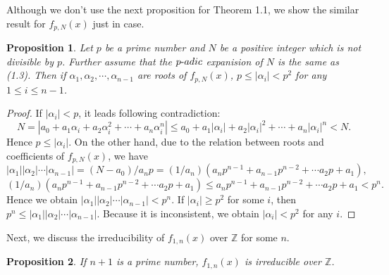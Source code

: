 \documentclass{article}
\newtheorem{prop}{Proposition}[section]
\begin{document}
Although we don't use the next proposition for Theorem 1.1, we show the similar result for $f_{p,N}(x)$ just in case.
\begin{prop}
\upshape
Let $p$ be a prime number and $N$ be a positive integer which is not divisible by $p$. Further assume that the $p\mathchar`-adic$ expanision of $N$ is the same as (1.3). Then if $\alpha_{1}, \alpha_{2}, \cdots, \alpha_{n-1}$ are roots of $f_{p,N}(x)$, $p\leq |\alpha_{i}|< p^{2}$ for any $1\leq i\leq n-1$.
\end{prop}

\begin{proof}
If $|\alpha_{i}|<p$, it leads following contradiction:
\begin{equation}
N=|a_{0}+a_{1}\alpha_{i}+a_{2}\alpha_{i}^{2}+\cdots+a_{n}\alpha_{i}^{n}|\leq a_{0}+a_{1}|\alpha_{i}|+a_{2}|\alpha_{i}|^{2}+\cdots+a_{n}|\alpha_{i}|^{n}<N \nonumber.
\end{equation}
Hence $p\leq |\alpha_{i}|$. On the other hand, due to the relation between roots and coefficients of $f_{p,N}(x)$, we have
\begin{equation}
|\alpha_{1}||\alpha_{2}|\cdots|\alpha_{n-1}|=(N-a_{0})/a_{n}p= (1/a_{n})(a_{n}p^{n-1}+a_{n-1}p^{n-2}+\cdots a_{2}p+a_{1}),
\end{equation}
\begin{equation}
(1/a_{n})(a_{n}p^{n-1}+a_{n-1}p^{n-2}+\cdots a_{2}p+a_{1})\leq a_{n}p^{n-1}+a_{n-1}p^{n-2}+\cdots a_{2}p+a_{1}<p^{n}.
\end{equation}
Hence we obtain $|\alpha_{1}||\alpha_{2}|\cdots|\alpha_{n-1}|<p^{n}$. If $|\alpha_{i}|\geq p^{2}$ for some $i$, then $p^{n}\leq |\alpha_{1}||\alpha_{2}|\cdots|\alpha_{n-1}|$. Because it is inconsistent, we obtain $|\alpha_{i}|<p^{2}$ for any ${i}$.

\end{proof}

Next, we discuss the irreducibility of $f_{1,n}(x)$ over $\mathbb{Z}$ for some $n$.
\begin{prop}
\upshape
If $n+1$ is a prime number, $f_{1,n}(x)$ is irreducible over $\mathbb{Z}$.
\end{prop}
\end{document}
